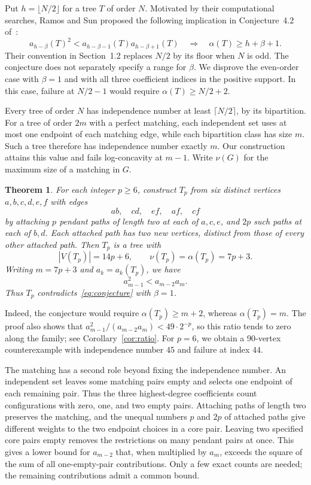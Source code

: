 \documentclass[11pt,a4paper]{article}
\newtheorem{theorem}{Theorem}[section]
\theoremstyle{remark}
\numberwithin{equation}{section}
\begin{document}
Put $h=\lfloor N/2\rfloor$ for a tree $T$ of order $N$.
Motivated by their computational searches, Ramos and Sun proposed
the following implication in Conjecture~4.2 of~\cite{RamosSun2025}:
\begin{equation}
 a_{h-\beta}(T)^2<a_{h-\beta-1}(T)a_{h-\beta+1}(T)
 \quad\Longrightarrow\quad
 \alpha(T)\geq h+\beta+1.
 \label{eq:conjecture}
\end{equation}
Their convention in Section~1.2 replaces $N/2$ by its floor when
$N$ is odd. The conjecture does not separately specify a range for
$\beta$. We disprove the even-order case with $\beta=1$ and with
all three coefficient indices in the positive support.
In this case, failure at $N/2-1$ would require
$\alpha(T)\geq N/2+2$.

Every tree of order $N$ has independence number at least
$\lceil N/2\rceil$, by its bipartition. For a tree of order $2m$
with a perfect matching, each independent set uses at most one
endpoint of each matching edge, while each bipartition class has
size $m$. Such a tree therefore has independence number exactly $m$.
Our construction attains this value and fails log-concavity at $m-1$.
Write $\nu(G)$ for the maximum size of a matching in $G$.

\begin{theorem}\label{thm:main}
For each integer $p\geq6$, construct $T_p$ from six distinct vertices
$a,b,c,d,e,f$ with edges
\[
 ab,\quad cd,\quad ef,\quad af,\quad cf
\]
by attaching $p$ pendant paths of length two at each of $a,c,e$, and
$2p$ such paths at each of $b,d$. Each attached path has two new
vertices, distinct from those of every other attached path.
Then $T_p$ is a tree with
\[
 |V(T_p)|=14p+6,\qquad \nu(T_p)=\alpha(T_p)=7p+3.
\]
Writing $m=7p+3$ and $a_k=a_k(T_p)$, we have
\begin{equation}
 a_{m-1}^2<a_{m-2}a_m.
 \label{eq:failure}
\end{equation}
Thus $T_p$ contradicts~\eqref{eq:conjecture} with $\beta=1$.
\end{theorem}

Indeed, the conjecture would require $\alpha(T_p)\geq m+2$,
whereas $\alpha(T_p)=m$. The proof also shows that
$a_{m-1}^2/(a_{m-2}a_m)<49\cdot2^{-p}$, so this ratio tends to zero
along the family; see Corollary~\ref{cor:ratio}.
For $p=6$, we obtain a 90-vertex counterexample with independence
number $45$ and failure at index $44$.

The matching has a second role beyond fixing the independence number.
An independent set leaves some matching pairs empty and selects one
endpoint of each remaining pair. Thus the three highest-degree
coefficients count configurations with zero, one, and two empty pairs.
Attaching paths of length two preserves the matching, and the unequal
numbers $p$ and $2p$ of attached paths give different weights to the
two endpoint choices in a core pair. Leaving two specified core pairs
empty removes the restrictions on many pendant pairs at once.
This gives a lower bound for $a_{m-2}$ that, when multiplied by $a_m$,
exceeds the square of the sum of all one-empty-pair contributions. Only a few
exact counts are needed; the remaining contributions admit a common
bound.
\end{document}
